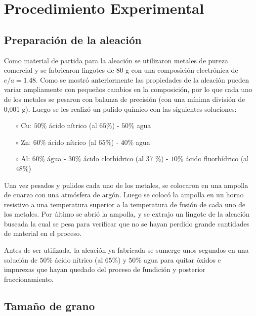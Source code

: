 \documentclass[a4paper,12pt,fleqn,twoside,openany]{book}
\begin{document}
\chapter{Procedimiento Experimental}



\section{Preparación de la aleación}


Como material de partida para la aleación se utilizaron metales de pureza comercial y se fabricaron lingotes de 80 g con una composición electrónica de 
$e/a=1.48$. Como se mostró anteriormente las propiedades de la aleación pueden variar ampliamente 
con pequeños cambios en la composición, por lo que cada uno de los metales se pesaron con balanza de precisión (con una mínima división de 0,001 g). 
Luego se les realizó un pulido químico con las siguientes soluciones:
\begin{itemize}
 \item[$\circ$] Cu: $50 \%$ ácido nítrico (al $65 \%$) - $50 \%$ agua
 \item[$\circ$] Zn: $60 \%$ ácido nítrico (al $65 \%$) - $40 \%$ agua
 \item[$\circ$] Al: $60 \%$ água - $30 \%$ ácido clorhídrico (al 37 \%) - $10 \%$ ácido fluorhídrico (al $48 \%$)
\end{itemize}

Una vez pesados y pulidos cada uno de los metales, se colocaron en una ampolla de cuarzo con una atmósfera de argón. Luego se colocó la ampolla en 
un horno resistivo a una temperatura superior a la temperatura de fusión de cada uno de los metales. Por último se abrió la ampolla, y se extrajo un 
lingote de la aleación buscada la cual se pesa para verificar que no se hayan perdido grande cantidades de material en el proceso. 

Antes de ser utilizada, la aleación ya fabricada se sumerge unos segundos en una solución de $50 \%$ ácido nítrico (al $65 \%$) y $50 \%$ agua para 
quitar óxidos e impurezas que hayan quedado del proceso de fundición y posterior fraccionamiento.


\section{Tamaño de grano}
\end{document}
